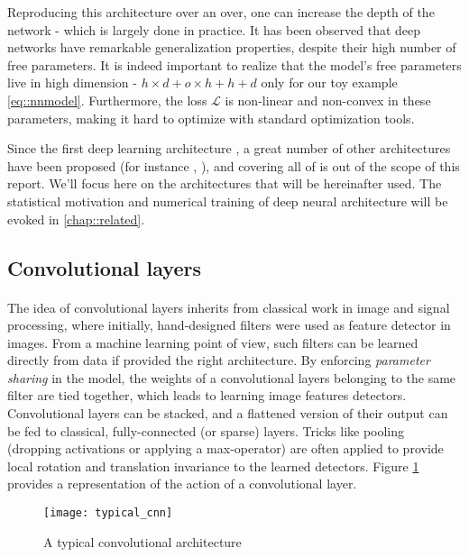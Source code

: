 {{			Reproducing this architecture over an over, one can increase the depth of the network - which is largely done in practice. It has been observed that deep networks have remarkable generalization properties, despite their high number of free parameters. It is indeed important to realize that the model's free parameters live in high dimension - $h\times d + o\times h + h + d$ only for our toy example \eqref{eq::nnmodel}. Furthermore, the loss $\mathcal{L}$ is non-linear and non-convex in these parameters, making it hard to optimize with standard optimization tools. 
			
			Since the first deep learning architecture , a great number of other architectures have been proposed (for instance \cite{he2016deep}, \cite{sabour2017dynamic}), and covering all of is out of the scope of this report. We'll focus here on the architectures that will be hereinafter used. The statistical motivation and numerical training of deep neural architecture will be evoked in \ref{chap::related}.
			
			\subsection{Convolutional layers}
			{
				\paragraph{} The idea of convolutional layers inherits from classical work in image and signal processing, where initially, hand-designed filters were used as feature detector in images. From a machine learning point of view, such filters can be learned directly from data if provided the right architecture. By enforcing \emph{parameter sharing} in the model, the weights of a convolutional layers belonging to the same filter are tied together, which leads to learning image features detectors. Convolutional layers can be stacked, and a flattened version of their output can be fed to classical, fully-connected (or sparse) layers. Tricks like pooling (dropping activations or applying a max-operator) are often applied to provide local rotation and translation invariance to the learned detectors. Figure \ref{fig::conv} provides a representation of the action of a convolutional layer. 
				
				\begin{figure}[h!]
					\begin{center}
						\texttt{[image: typical\_cnn]}
						\caption{A typical convolutional architecture}
						\label{fig::conv}	
					\end{center}
				\end{figure}	
				
}}}
